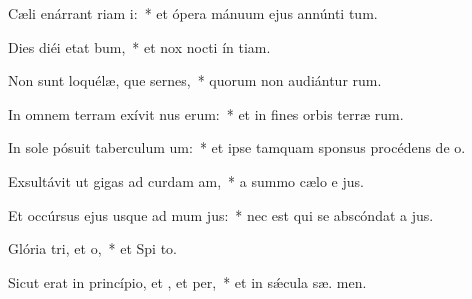 \item Cæli enárrant riam i:~* et ópera mánuum ejus annúnti tum.
\item Dies diéi etat bum,~* et nox nocti ín tiam.
\item Non sunt loquélæ, que sernes,~* quorum non audiántur  rum.
\item In omnem terram exívit nus erum:~* et in fines orbis terræ  rum.
\item In sole pósuit taberculum um:~* et ipse tamquam sponsus procédens de  o.
\item Exsultávit ut gigas ad curdam am,~* a summo cælo e jus.
\item Et occúrsus ejus usque ad mum jus:~* nec est qui se abscóndat a  jus.
\item Glória tri, et o,~* et Spi to.
\item Sicut erat in princípio, et , et per,~* et in sǽcula sæ. men.
